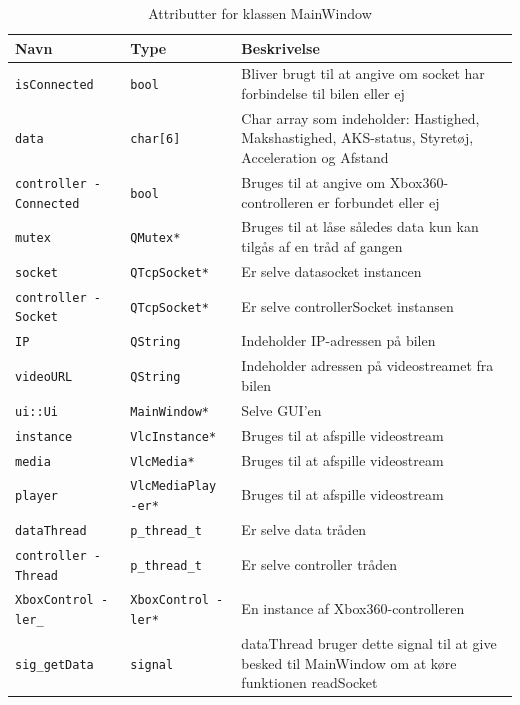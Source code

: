\begin{table}[H]
\begin{tabularx}{\textwidth}{| L{2.5cm} | l | Z |} \hline
Navn & Type & Beskrivelse \\\hline
\texttt{isConnected}         & \texttt{bool}           &Bliver brugt til at angive om socket har forbindelse til bilen eller ej \\\hline
\texttt{data}                & \texttt{char[6]}        &Char array som indeholder: Hastighed, Makshastighed, AKS-status, Styretøj, Acceleration og Afstand\\\hline
\texttt{controller -Connected} & \texttt{bool}           &Bruges til at angive om Xbox360-controlleren er forbundet eller ej\\\hline
\texttt{mutex}               & \texttt{QMutex*}        &Bruges til at låse således data kun kan tilgås af en tråd af gangen\\\hline
\texttt{socket}              & \texttt{QTcpSocket*}    &Er selve datasocket instancen\\\hline
\texttt{controller -Socket}    & \texttt{QTcpSocket*}    &Er selve controllerSocket instansen\\\hline
\texttt{IP}                  & \texttt{QString}        &Indeholder IP-adressen på bilen\\\hline
\texttt{videoURL}            & \texttt{QString}        &Indeholder adressen på videostreamet fra bilen\\\hline
\texttt{ui::Ui}              & \texttt{MainWindow*}    &Selve GUI'en\\\hline
\texttt{instance}            & \texttt{VlcInstance*}   &Bruges til at afspille videostream\\\hline
\texttt{media}               & \texttt{VlcMedia*}      &Bruges til at afspille videostream\\\hline
\texttt{player}              & \texttt{VlcMediaPlay -er*}&Bruges til at afspille videostream\\\hline
\texttt{dataThread}          & \texttt{p\_thread\_t}     &Er selve data tråden\\\hline
\texttt{controller -Thread}    & \texttt{p\_thread\_t}     &Er selve controller tråden\\\hline
\texttt{XboxControl -ler\_}     & \texttt{XboxControl -ler*}&En instance af Xbox360-controlleren\\\hline
\texttt{sig\_getData}     & \texttt{signal}&dataThread bruger dette signal til at give besked til MainWindow om at køre funktionen readSocket \\\hline

\end{tabularx}
\caption{Attributter for klassen MainWindow}
\label{table:attr_distancesensor}
\end{table}

